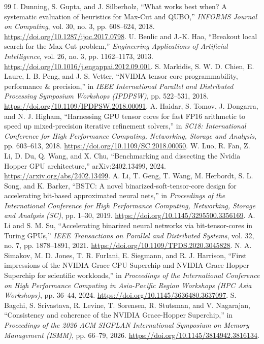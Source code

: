 \documentclass[11pt,a4paper]{article}
\begin{document}
\begin{thebibliography}{99}
 I. Dunning, S. Gupta, and J. Silberholz, ``What works best when? A systematic evaluation of heuristics for Max-Cut and QUBO,'' \textit{INFORMS Journal on Computing}, vol. 30, no. 3, pp. 608--624, 2018. \url{https://doi.org/10.1287/ijoc.2017.0798}.
 U. Benlic and J.-K. Hao, ``Breakout local search for the Max-Cut problem,'' \textit{Engineering Applications of Artificial Intelligence}, vol. 26, no. 3, pp. 1162--1173, 2013. \url{https://doi.org/10.1016/j.engappai.2012.09.001}.
 S. Markidis, S. W. D. Chien, E. Laure, I. B. Peng, and J. S. Vetter, ``NVIDIA tensor core programmability, performance \& precision,'' in \textit{IEEE International Parallel and Distributed Processing Symposium Workshops (IPDPSW)}, pp. 522--531, 2018. \url{https://doi.org/10.1109/IPDPSW.2018.00091}.
 A. Haidar, S. Tomov, J. Dongarra, and N. J. Higham, ``Harnessing GPU tensor cores for fast FP16 arithmetic to speed up mixed-precision iterative refinement solvers,'' in \textit{SC18: International Conference for High Performance Computing, Networking, Storage and Analysis}, pp. 603--613, 2018. \url{https://doi.org/10.1109/SC.2018.00050}.
 W. Luo, R. Fan, Z. Li, D. Du, Q. Wang, and X. Chu, ``Benchmarking and dissecting the Nvidia Hopper GPU architecture,'' arXiv:2402.13499, 2024. \url{https://arxiv.org/abs/2402.13499}.
 A. Li, T. Geng, T. Wang, M. Herbordt, S. L. Song, and K. Barker, ``BSTC: A novel binarized-soft-tensor-core design for accelerating bit-based approximated neural nets,'' in \textit{Proceedings of the International Conference for High Performance Computing, Networking, Storage and Analysis (SC)}, pp. 1--30, 2019. \url{https://doi.org/10.1145/3295500.3356169}.
 A. Li and S. M. Su, ``Accelerating binarized neural networks via bit-tensor-cores in Turing GPUs,'' \textit{IEEE Transactions on Parallel and Distributed Systems}, vol. 32, no. 7, pp. 1878--1891, 2021. \url{https://doi.org/10.1109/TPDS.2020.3045828}.
 N. A. Simakov, M. D. Jones, T. R. Furlani, E. Siegmann, and R. J. Harrison, ``First impressions of the NVIDIA Grace CPU Superchip and NVIDIA Grace Hopper Superchip for scientific workloads,'' in \textit{Proceedings of the International Conference on High Performance Computing in Asia-Pacific Region Workshops (HPC Asia Workshops)}, pp. 36--44, 2024. \url{https://doi.org/10.1145/3636480.3637097}.
 S. Bagchi, S. Srivastava, R. Levine, T. Sorensen, R. Stutsman, and V. Nagarajan, ``Consistency and coherence of the NVIDIA Grace-Hopper Superchip,'' in \textit{Proceedings of the 2026 ACM SIGPLAN International Symposium on Memory Management (ISMM)}, pp. 66--79, 2026. \url{https://doi.org/10.1145/3814942.3816134}.

\end{thebibliography}
\end{document}
